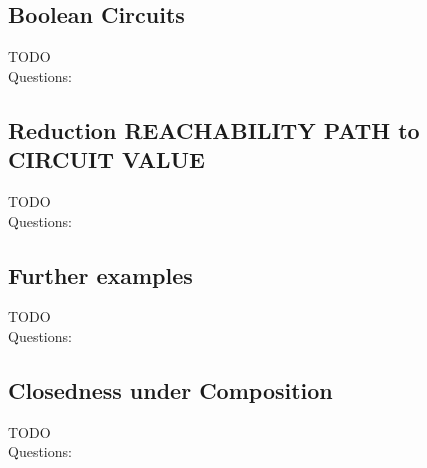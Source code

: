 \documentclass[a4]{scrartcl}
\begin{document}

\subsection*{Boolean Circuits}


\color{red} TODO \\
\color{black}
\color{violet} Questions:
\color{black}









\subsection*{Reduction REACHABILITY PATH to CIRCUIT VALUE}

\color{red} TODO \\
\color{black}
\color{violet} Questions:
\color{black}








\subsection*{Further examples}

\color{red} TODO \\
\color{black}
\color{violet} Questions:
\color{black}








\subsection*{Closedness under Composition}


\color{red} TODO \\
\color{black}
\color{violet} Questions:
\color{black}





\newpage

\printbibliography
\end{document}
